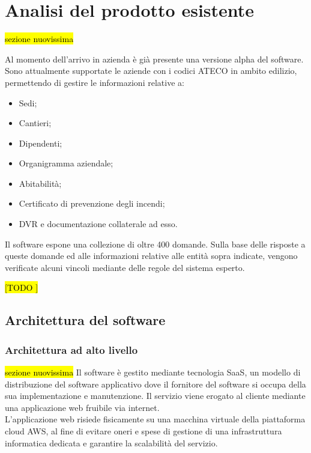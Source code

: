 
\section{Analisi del prodotto esistente}
\hl{sezione nuovissima}

Al momento dell'arrivo in azienda è già presente una versione alpha del software. \\
Sono attualmente supportate le aziende con i codici \gls{ATECO} in ambito edilizio, permettendo di gestire le informazioni relative a:
\begin{itemize}
	\item Sedi;
	\item Cantieri;
	\item Dipendenti;
	\item Organigramma aziendale;
	\item Abitabilità;
	\item Certificato di prevenzione degli incendi;
	\item \gls{DVR} e documentazione collaterale ad esso.
\end{itemize}
Il software espone una collezione di oltre 400 domande. Sulla base delle risposte a queste domande ed alle informazioni relative alle entità sopra indicate, vengono verificate alcuni vincoli mediante delle regole del sistema esperto.


\hl{[TODO ]}

\subsection{Architettura del software}
\subsubsection{Architettura ad alto livello}
\hl{sezione nuovissima}
Il software è gestito mediante tecnologia \gls{SaaS}, un modello di distribuzione del software applicativo dove il fornitore del software si occupa della sua implementazione e manutenzione. Il servizio viene erogato al cliente mediante una applicazione web fruibile via internet. \\ 
L'applicazione web risiede fisicamente su una macchina virtuale della piattaforma cloud \gls{AWS}, al fine di evitare oneri e spese di gestione di una infrastruttura informatica dedicata e garantire la scalabilità del servizio.\\


